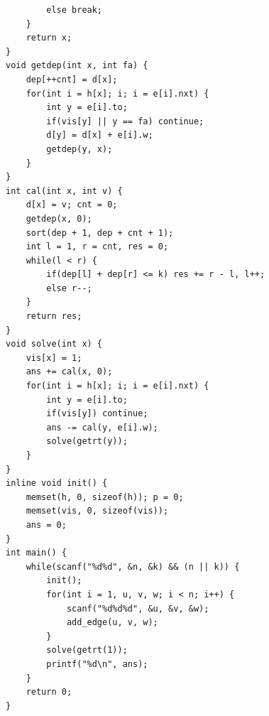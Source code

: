 \documentclass[10pt]{ctexart}
\begin{document}
{\begin{lstlisting}
        else break;
    }
    return x;
}
void getdep(int x, int fa) {
    dep[++cnt] = d[x];
    for(int i = h[x]; i; i = e[i].nxt) {
        int y = e[i].to;
        if(vis[y] || y == fa) continue;
        d[y] = d[x] + e[i].w;
        getdep(y, x);
    }
}
int cal(int x, int v) {
    d[x] = v; cnt = 0;
    getdep(x, 0);
    sort(dep + 1, dep + cnt + 1);
    int l = 1, r = cnt, res = 0;
    while(l < r) {
        if(dep[l] + dep[r] <= k) res += r - l, l++;
        else r--;
    }
    return res;
}
void solve(int x) {
    vis[x] = 1;
    ans += cal(x, 0);
    for(int i = h[x]; i; i = e[i].nxt) {
        int y = e[i].to;
        if(vis[y]) continue;
        ans -= cal(y, e[i].w);
        solve(getrt(y));
    }
}
inline void init() {
    memset(h, 0, sizeof(h)); p = 0;
    memset(vis, 0, sizeof(vis));
    ans = 0;
}
int main() {
    while(scanf("%d%d", &n, &k) && (n || k)) {
        init();
        for(int i = 1, u, v, w; i < n; i++) {
            scanf("%d%d%d", &u, &v, &w);
            add_edge(u, v, w);
        }
        solve(getrt(1));
        printf("%d\n", ans);
    }
    return 0;
}
\end{lstlisting}

}
\end{document}
